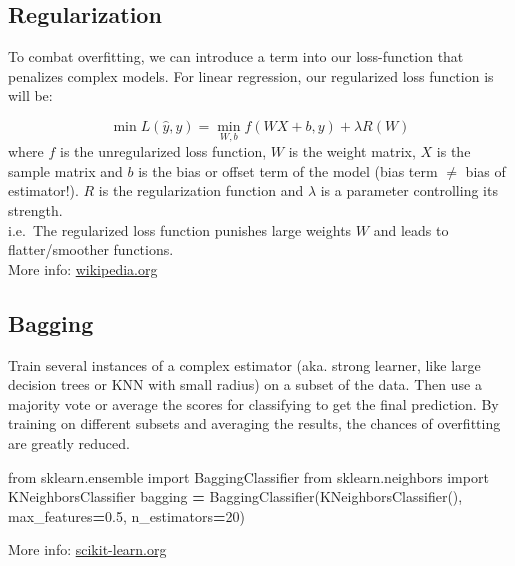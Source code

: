 \documentclass[
]{book}
\newenvironment{Shaded}{\begin{snugshade}}{\end{snugshade}}
\newcommand{\DecValTok}[1]{\textcolor[rgb]{0.00,0.00,0.81}{#1}}
\newcommand{\FloatTok}[1]{\textcolor[rgb]{0.00,0.00,0.81}{#1}}
\newcommand{\ImportTok}[1]{#1}
\newcommand{\NormalTok}[1]{#1}
\newcommand{\OperatorTok}[1]{\textcolor[rgb]{0.81,0.36,0.00}{\textbf{#1}}}
\begin{document}
\hypertarget{regularization}{%
\subsection{Regularization}\label{regularization}}

To combat overfitting, we can introduce a term into our loss-function
that penalizes complex models. For linear regression, our regularized
loss function is will be:

\[\min L(\hat{y},y)= \min_{W,b} f(WX+b,y)+\lambda R(W)\] where \(f\) is
the unregularized loss function, \(W\) is the weight matrix, \(X\) is the
sample matrix and \(b\) is the bias or offset term of the model (bias term
\(\neq\) bias of estimator!). \(R\) is the regularization function and
\(\lambda\) is a parameter controlling its strength.\\
i.e.~The regularized loss function punishes large weights \(W\) and leads
to flatter/smoother functions.\\

More info:
\href{https://en.wikipedia.org/wiki/Regularization_(mathematics)}{wikipedia.org}

\hypertarget{bagging}{%
\subsection{Bagging}\label{bagging}}

Train several instances of a complex estimator (aka. strong learner,
like large decision trees or KNN with small radius) on a subset of the
data. Then use a majority vote or average the scores for classifying to
get the final prediction. By training on different subsets and averaging
the results, the chances of overfitting are greatly reduced.

\begin{Shaded}
\begin{Highlighting}[]
\ImportTok{from}\NormalTok{ sklearn.ensemble }\ImportTok{import}\NormalTok{ BaggingClassifier}
\ImportTok{from}\NormalTok{ sklearn.neighbors }\ImportTok{import}\NormalTok{ KNeighborsClassifier}
\NormalTok{bagging }\OperatorTok{=}\NormalTok{ BaggingClassifier(KNeighborsClassifier(), max\_features}\OperatorTok{=}\FloatTok{0.5}\NormalTok{, n\_estimators}\OperatorTok{=}\DecValTok{20}\NormalTok{)}
\end{Highlighting}
\end{Shaded}

More info:
\href{https://scikit-learn.org/stable/modules/generated/sklearn.ensemble.BaggingClassifier.html}{scikit-learn.org}\\
\end{document}
